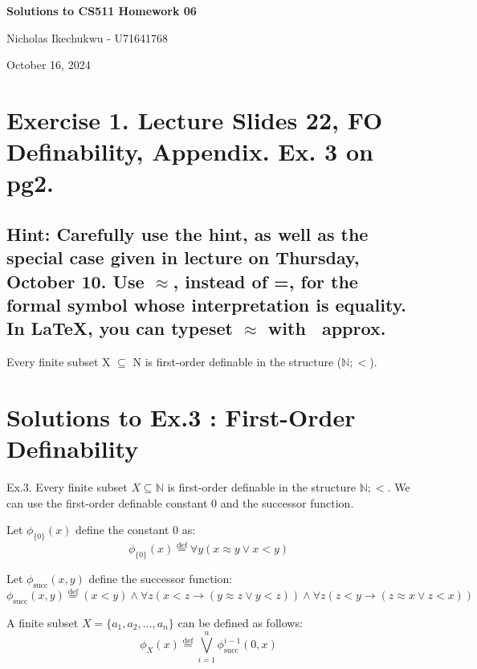 \documentclass{article}
\newcommand{\defeq}{\stackrel{\text{def}}{=}}
\begin{document}
\begin{center}
    \Large\textbf{Solutions to CS511 Homework 06}
    
    \vspace{0.5cm}
    
    \large Nicholas Ikechukwu - U71641768
    
    \vspace{0.3cm}
    
    \large October 16, 2024
\end{center}



\section*{Exercise 1. Lecture Slides 22, FO Definability, Appendix. Ex. 3 on pg2. }

\subsection*{Hint: Carefully use the hint, as well as the special case given in lecture on Thursday, October 10.
Use $\approx$, instead of =, for the formal symbol whose interpretation is equality. In LaTeX, you can typeset
$\approx$ with \ approx.}

\begin{mdframed}
    Every finite subset X $\subseteq$ N is first-order definable in the structure ($\mathbb{N}; <$).
\end{mdframed}

\section*{Solutions to Ex.3 : First-Order Definability}
Ex.3. Every finite subset $X \subseteq \mathbb{N}$ is first-order definable in the structure $\mathbb{N}; <$. We can use the first-order definable constant 0 and the successor function.

Let $\phi_{\{0\}}(x)$ define the constant 0 as:
$$
\phi_{\{0\}}(x) \defeq \forall y (x \approx y \lor x < y)
$$


Let $\phi_{\text{succ}}(x, y)$ define the successor function:
$$
\phi_{\text{succ}}(x, y) \defeq (x < y) \land \forall z (x < z \rightarrow (y \approx z \lor y < z)) \land \forall z (z < y \rightarrow (z \approx x \lor z < x))
$$


A finite subset $X = \{ a_1, a_2, \ldots, a_n \}$ can be defined as follows:
$$
\phi_X(x) \defeq \bigvee_{i=1}^{n} \phi_{\text{succ}}^{i-1}(0, x)
$$
\end{document}

